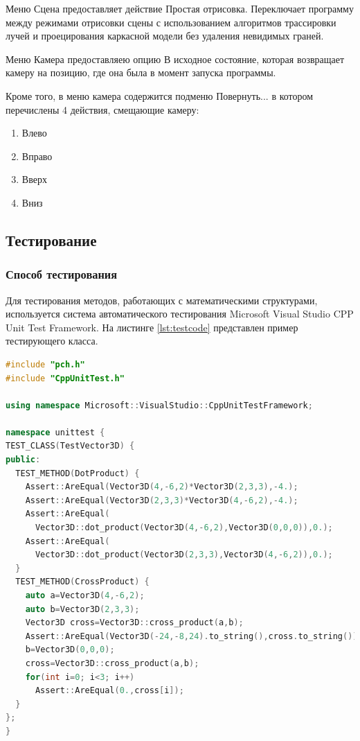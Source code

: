 Меню Сцена предоставляет действие Простая отрисовка. Переключает программу между режимами отрисовки сцены с использованием алгоритмов трассировки лучей и проецирования каркасной модели без удаления невидимых граней.

Меню Камера предоставляею опцию В исходное состояние, которая возвращает камеру на позицию, где она была в момент запуска программы.

Кроме того, в меню камера содержится подменю Повернуть... в котором перечислены 4 действия, смещающие камеру:
\begin{enumerate}
	\item Влево
	\item Вправо
	\item Вверх
	\item Вниз
\end{enumerate}

\subsection{Тестирование}
\subsubsection{Способ тестирования}
Для тестирования методов, работающих с математическими структурами, используется система автоматического тестирования Microsoft Visual Studio CPP Unit Test Framework. На листинге \ref{lst:testcode} представлен пример тестирующего класса.

\begin{lstlisting}[caption={Класс, реализующий тестирование методов для работы с трёхмерным вектором},label={lst:testcode},language=c++]
#include "pch.h"
#include "CppUnitTest.h"

using namespace Microsoft::VisualStudio::CppUnitTestFramework;

namespace unittest {	
TEST_CLASS(TestVector3D) {
public:
  TEST_METHOD(DotProduct) {
    Assert::AreEqual(Vector3D(4,-6,2)*Vector3D(2,3,3),-4.);
    Assert::AreEqual(Vector3D(2,3,3)*Vector3D(4,-6,2),-4.);
    Assert::AreEqual(
      Vector3D::dot_product(Vector3D(4,-6,2),Vector3D(0,0,0)),0.);
    Assert::AreEqual(
      Vector3D::dot_product(Vector3D(2,3,3),Vector3D(4,-6,2)),0.);
  }
  TEST_METHOD(CrossProduct) {
    auto a=Vector3D(4,-6,2);
    auto b=Vector3D(2,3,3);
    Vector3D cross=Vector3D::cross_product(a,b);
    Assert::AreEqual(Vector3D(-24,-8,24).to_string(),cross.to_string());	
    b=Vector3D(0,0,0);
    cross=Vector3D::cross_product(a,b);
    for(int i=0; i<3; i++)
      Assert::AreEqual(0.,cross[i]);
  }
};
}
\end{lstlisting}
